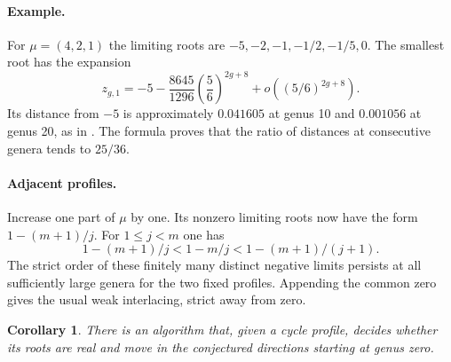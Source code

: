 \documentclass[11pt]{article}
\newtheorem*{corollary}{Corollary}
\begin{document}
\paragraph{Example.}
For $\mu=(4,2,1)$ the limiting roots are $-5,-2,-1,-1/2,-1/5,0$.
The smallest root has the expansion
\[
 z_{g,1}=-5-\frac{8645}{1296}\left(\frac56\right)^{2g+8}
                 +o\!\left((5/6)^{2g+8}\right).
\]
Its distance from $-5$ is approximately $0.041605$ at genus 10 and $0.001056$ at genus 20, as in \cite[Fig.~3]{cdm}. The formula proves that the ratio of distances at consecutive genera tends to $25/36$.

\paragraph{Adjacent profiles.}
Increase one part of $\mu$ by one. Its nonzero limiting roots now have the form $1-(m+1)/j$. For $1\le j<m$ one has
\[
 1-(m+1)/j < 1-m/j <1-(m+1)/(j+1).
\]
The strict order of these finitely many distinct negative limits persists at all sufficiently large genera for the two fixed profiles. Appending the common zero gives the usual weak interlacing, strict away from zero.

\begin{corollary}
There is an algorithm that, given a cycle profile, decides whether its roots are real and move in the conjectured directions starting at genus zero.
\end{corollary}
\end{document}
